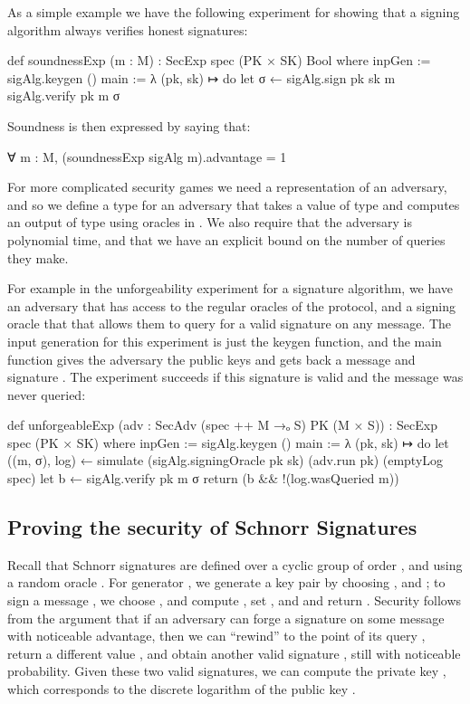 As a simple example we have the following experiment for showing that a signing algorithm  always verifies honest signatures:
\begin{leancode}
  def soundnessExp (m : M) : SecExp spec (PK × SK) Bool where
    inpGen := sigAlg.keygen ()
    main := λ (pk, sk) ↦ do
      let σ ← sigAlg.sign pk sk m
      sigAlg.verify pk m σ
\end{leancode}
Soundness is then expressed by saying that:
\begin{leancode}
  ∀ m : M, (soundnessExp sigAlg m).advantage = 1
\end{leancode}

For more complicated security games we need a representation of an adversary, and so we define a type  for an adversary that takes a value of type  and computes an output of type  using oracles in .
We also require that the adversary is polynomial time, and that we have an explicit bound on the number of queries they make.

For example in the unforgeability experiment for a signature algorithm, we have an adversary that has access to the regular oracles  of the protocol, and a signing oracle  that that allows them to query for a valid signature on any message.
The input generation for this experiment is just the keygen function, and the main function gives the adversary the public keys and gets back a message  and signature .
The experiment succeeds if this signature is valid and the message was never queried:
\begin{leancode}
  def unforgeableExp (adv : SecAdv (spec ++ M →ₒ S) PK (M × S)) :
      SecExp spec (PK × SK) where
    inpGen := sigAlg.keygen ()
    main := λ (pk, sk) ↦ do
      let ((m, σ), log) ←
        simulate (sigAlg.signingOracle pk sk) (adv.run pk) (emptyLog spec)
      let b ← sigAlg.verify pk m σ
      return (b && !(log.wasQueried m))
\end{leancode}

\subsection{Proving the security of Schnorr Signatures}
\label{sec:schnorr}
Recall that Schnorr signatures are defined over a cyclic group  of order , and using a random oracle . 
For generator , we generate a key pair by choosing ,   and ; to sign a message , we choose , and compute , set , and  and return .
Security follows from the argument that if an adversary  can forge a signature  on some message  with noticeable advantage, then we can ``rewind''  to the point of its query , return a different value , and obtain another valid signature , still with noticeable probability.
Given these two valid signatures, we can compute the private key , which corresponds to the discrete logarithm of the public key .

